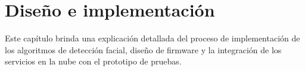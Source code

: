 \chapter{Diseño e implementación} %

\label{Chapter3} %

Este capítulo brinda una explicación detallada del proceso de implementación de los algoritmos de detección facial, diseño de firmware y la integración de los servicios en la nube con el prototipo de pruebas.



